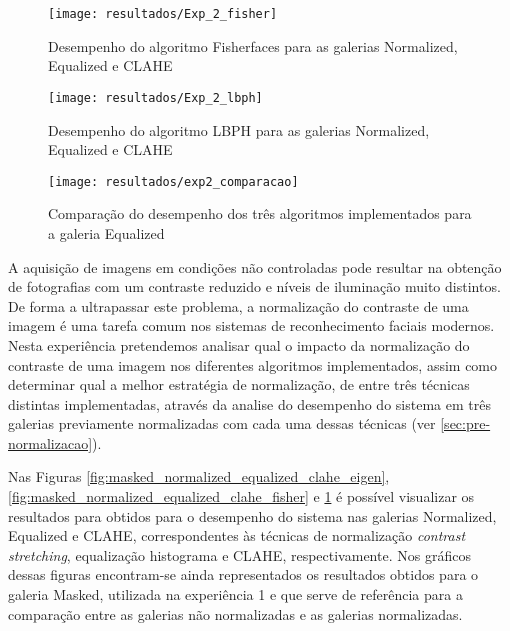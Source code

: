         \begin{figure}[p]
                \centering
                \texttt{[image: resultados/Exp\_2\_fisher]}
                \caption{Desempenho do algoritmo Fisherfaces para as galerias Normalized, Equalized e CLAHE}
                \label{fig:masked_normalized_equalized_clahe_fisher}
                \centering
                \texttt{[image: resultados/Exp\_2\_lbph]}
                \caption{Desempenho do algoritmo LBPH para as galerias Normalized, Equalized e CLAHE}
                \label{fig:masked_normalized_equalized_clahe_lbph}                
        \end{figure}%
        
\begin{figure}[ht]
  \begin{center}
    \leavevmode
    \texttt{[image: resultados/exp2\_comparacao]}
    \caption{Comparação do desempenho dos três algoritmos implementados para a galeria Equalized}
    \label{fig:exp2_comaparacao}
  \end{center}
\end{figure}        


A aquisição de imagens em condições não controladas pode resultar na obtenção de fotografias com um contraste reduzido e níveis de iluminação muito distintos. De forma a ultrapassar este problema, a normalização do contraste de uma imagem é uma tarefa comum nos sistemas de reconhecimento faciais modernos. Nesta experiência pretendemos analisar qual o impacto da normalização do contraste de uma imagem nos diferentes algoritmos implementados, assim como determinar qual a melhor estratégia de normalização, de entre três técnicas distintas implementadas, através da analise do desempenho do sistema em três galerias previamente normalizadas com cada uma dessas técnicas (ver \ref{sec:pre-normalizacao}).

Nas Figuras \ref{fig:masked_normalized_equalized_clahe_eigen}, \ref{fig:masked_normalized_equalized_clahe_fisher} e \ref{fig:masked_normalized_equalized_clahe_lbph} é possível visualizar os resultados para obtidos para o desempenho do sistema nas galerias Normalized, Equalized e CLAHE, correspondentes às técnicas de normalização \textit{contrast stretching}, equalização histograma e CLAHE, respectivamente. Nos gráficos dessas figuras encontram-se ainda representados os resultados obtidos para o galeria Masked, utilizada na experiência 1 e que serve de referência para a comparação entre as galerias não normalizadas e as galerias normalizadas.

